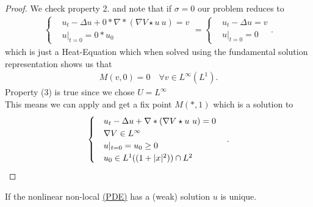 \begin{proof}
    We check property 2. and note that if $\sigma=0$ our problem reduces to 
  \begin{align*}
  \begin{cases}
    &u_t - \Delta u + 0*\nabla*(\nabla V \star  u \ u) = v\\
    &u \rvert_{t=0} = 0*u_{0} 
  \end{cases}
  =  
  \begin{cases}
    &u_t - \Delta u  = v\\
    &u \rvert_{t=0} = 0  
  \end{cases}
 .\end{align*}
 which is just a Heat-Equation which when solved using the fundamental solution representation shows us that 
 \begin{align*}
  M(v,0) =  0 \quad \forall  v \in  L^{\infty}(L^{1} )
 .\end{align*}
 Property (3) is true since we chose $U = L^{\infty} $\\[1ex]
 This means we can apply and get a fix point  $M(*,1)$ which is a solution  to 
 \begin{align*}
  \begin{cases}
    &u_t - \Delta u + \nabla*(\nabla V \star  u \ u) = 0 \quad  \\
    &\nabla V \in  L^{\infty}\\
    &u \rvert_{t=0} = u_{0}\ge 0  \quad \\
    &u_{0} \in L^{1}((1+\lvert x\rvert^2)) \cap L^{2} 
  \end{cases}
 .\end{align*}
\end{proof}
\begin{theorem}[Uniqueness]
 If the nonlinear non-local \hyperref[pde_mve_apprach]{(PDE)} has a (weak) solution $u$ is unique.
\end{theorem}
